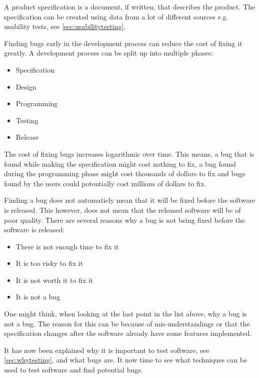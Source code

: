 A product specification is a document, if written, that describes the product.
The specification can be created using data from a lot of different sources e.g. usability tests, see \cref{sec:usabilitytesting}. \cite{SoftwareTesting}

Finding bugs early in the development process can reduce the cost of fixing it greatly.
A development process can be split up into multiple phases:

\begin{itemize}
	\item Specification
	\item Design
	\item Programming
	\item Testing
	\item Release
\end{itemize}

The cost of fixing bugs increases logarithmic over time.
This means, a bug that is found while making the specification might cost nothing to fix, a bug found during the programming phase might cost thousands of dollars to fix and bugs found by the users could potentially cost millions of dollars to fix. \cite{SoftwareTesting}


Finding a bug does not automaticly mean that it will be fixed before the software is released.
This however, does not mean that the released software will be of poor quality.
There are several reasons why a bug is not being fixed before the software is released: \cite{SoftwareTesting}

\begin{itemize}
	\item There is not enough time to fix it
	\item It is too risky to fix it
	\item It is not worth it to fix it
	\item It is not a bug
\end{itemize}

One might think, when looking at the last point in the list above, why a bug is not a bug.
The reason for this can be because of mis-understandings or that the specification changes after the software already have some features implemented. \cite{SoftwareTesting}

It has now been explained why it is important to test software, see \cref{sec:whytesting}, and what bugs are.
It now time to see what techniques can be used to test software and find potential bugs.
